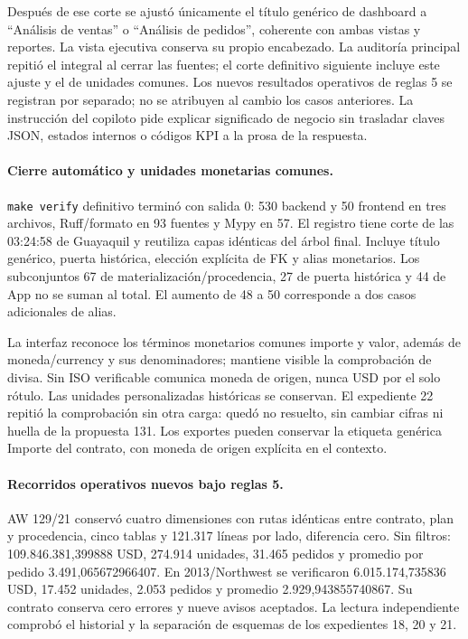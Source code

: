 \documentclass[11pt,letterpaper]{article}
\newcommand{\file}[1]{\texttt{#1}}
\begin{document}
Después de ese corte se ajustó únicamente el título genérico de dashboard a
``Análisis de ventas'' o ``Análisis de pedidos'', coherente con ambas vistas y
reportes. La vista ejecutiva conserva su propio encabezado. La auditoría principal repitió el integral al cerrar las fuentes; el corte
definitivo siguiente incluye este ajuste y el de unidades comunes. Los nuevos resultados operativos de
reglas 5 se registran por separado; no se atribuyen al cambio los casos anteriores.
La instrucción del copiloto pide explicar significado de negocio sin trasladar
claves JSON, estados internos o códigos KPI a la prosa de la respuesta.

\paragraph{Cierre automático y unidades monetarias comunes.}
\file{make verify} definitivo terminó con salida 0: 530 backend y 50 frontend en
tres archivos, Ruff/formato en 93 fuentes y Mypy en 57. El registro
 tiene corte de las 03:24:58 de
Guayaquil y reutiliza capas idénticas del árbol final. Incluye título genérico,
puerta histórica, elección explícita de FK y alias monetarios. Los subconjuntos
67 de materialización/procedencia, 27 de puerta histórica y 44 de App no se suman
al total. El aumento de 48 a 50 corresponde a dos casos adicionales de alias.

La interfaz reconoce los términos monetarios comunes importe y valor, además de
moneda/currency y sus denominadores; mantiene visible la comprobación de divisa.
Sin ISO verificable comunica moneda de origen, nunca USD por el solo rótulo.
Las unidades personalizadas históricas se conservan. El expediente 22 repitió la
comprobación sin otra carga: quedó no resuelto, sin cambiar cifras ni huella de
la propuesta 131. Los exportes pueden conservar la etiqueta genérica Importe
del contrato, con moneda de origen explícita en el contexto.

\paragraph{Recorridos operativos nuevos bajo reglas 5.}
AW 129/21 conservó cuatro dimensiones con rutas idénticas entre contrato, plan y
procedencia, cinco tablas y 121.317 líneas por lado, diferencia cero. Sin filtros:
109.846.381,399888 USD, 274.914 unidades, 31.465 pedidos y promedio por pedido
3.491,065672966407. En 2013/Northwest se verificaron 6.015.174,735836 USD,
17.452 unidades, 2.053 pedidos y promedio 2.929,943855740867. Su contrato conserva
cero errores y nueve avisos aceptados. La lectura independiente comprobó el
historial y la separación de esquemas de los expedientes 18, 20 y 21.
\end{document}
